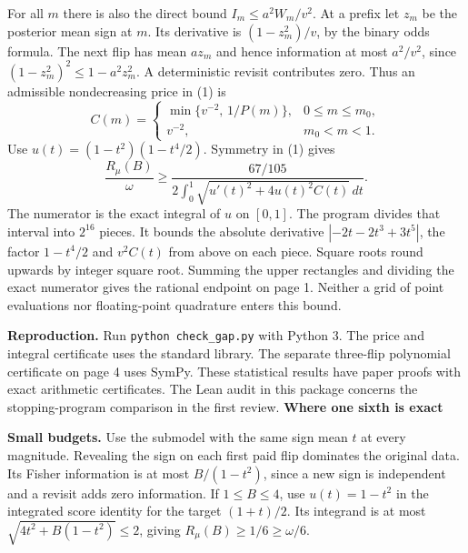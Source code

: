 \documentclass[11pt]{article}
\newcommand{\heading}[1]{{\LARGE\bfseries\color{ink} #1}\par\smallskip}
\begin{document}
For all $m$ there is also the direct bound $I_m\le a^2W_m/v^2$. At a prefix let $z_m$ be the posterior mean sign at $m$. Its derivative is $(1-z_m^2)/v$, by the binary odds formula. The next flip has mean $az_m$ and hence information at most $a^2/v^2$, since $(1-z_m^2)^2\le1-a^2z_m^2$. A deterministic revisit contributes zero. Thus an admissible nondecreasing price in (1) is
\[
 C(m)=
 \begin{cases}
 \min\{v^{-2},\,1/P(m)\},&0\le m\le m_0,\\
 v^{-2},&m_0<m<1 .
 \end{cases}
\]
Use $u(t)=(1-t^2)(1-t^4/2)$. Symmetry in (1) gives
\[
 \frac{R_\mu(B)}{\omega}\ge
 \frac{67/105}{2\int_0^1\sqrt{u'(t)^2+4u(t)^2 C(t)}\,dt}.
 \tag{5}
\]
The numerator is the exact integral of $u$ on $[0,1]$. The program divides that interval into $2^{16}$ pieces. It bounds the absolute derivative $|-2t-2t^3+3t^5|$, the factor $1-t^4/2$ and $v^2C(t)$ from above on each piece. Square roots round upwards by integer square root. Summing the upper rectangles and dividing the exact numerator gives the rational endpoint on page 1. Neither a grid of point evaluations nor floating-point quadrature enters this bound.

\textbf{Reproduction.} Run \texttt{python check\_gap.py} with Python 3. The price and integral certificate uses the standard library. The separate three-flip polynomial certificate on page 4 uses SymPy. These statistical results have paper proofs with exact arithmetic certificates. The Lean audit in this package concerns the stopping-program comparison in the first review.
\newpage
\heading{Where one sixth is exact}
\textbf{Small budgets.} Use the submodel with the same sign mean $t$ at every magnitude. Revealing the sign on each first paid flip dominates the original data. Its Fisher information is at most $B/(1-t^2)$, since a new sign is independent and a revisit adds zero information. If $1\le B\le4$, use $u(t)=1-t^2$ in the integrated score identity for the target $(1+t)/2$. Its integrand is at most $\sqrt{4t^2+B(1-t^2)}\le2$, giving $R_\mu(B)\ge1/6\ge\omega/6$.
\end{document}

